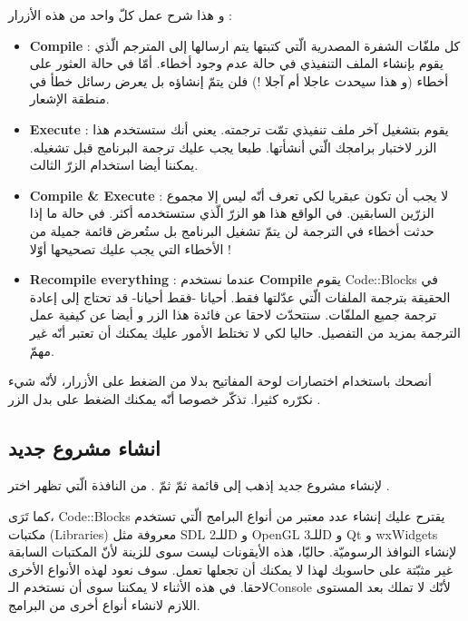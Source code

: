 
و هذا شرح عمل كلّ واحد من هذه الأزرار :

\begin{itemize}
  \item \textbf{\textenglish{Compile}} :
كل ملفّات الشفرة المصدرية الّتي كتبتها يتم ارسالها إلى المترجم الّذي يقوم بإنشاء الملف التنفيذي في حالة عدم وجود أخطاء. أمّا في حالة العثور على أخطاء (و هذا سيحدث عاجلا أم آجلا !) فلن يتمّ إنشاؤه بل يعرض رسائل خطأ في منطقة الإشعار.
  \item \textbf{\textenglish{Execute}} :
يقوم بتشغيل آخر ملف تنفيذي تمّت ترجمته. يعني أنك ستستخدم هذا الزر لاختبار برامجك الّتي أنشأتها. طبعا يجب عليك ترجمة البرنامج قبل تشغيله. يمكننا أيضا استخدام الزرّ الثالث.
  \item \textbf{\textenglish{Compile \& Execute}} :
لا يجب أن تكون عبقريا لكي تعرف أنّه ليس إلا مجموع الزرّين السابقين. في الواقع هذا هو الزرّ الّذي ستستخدمه أكثر. في حالة ما إذا حدثت أخطاء في الترجمة لن يتمّ تشغيل البرنامج بل ستُعرض قائمة جميلة من الأخطاء التي يجب عليك تصحيحها أوّلا !
  \item \textbf{\textenglish{Recompile everything}} :
 عندما نستخدم
\textbf{\textenglish{Compile}}
يقوم
\textenglish{Code::Blocks}
في الحقيقة بترجمة الملفات الّتي عدّلتها فقط. أحيانا -فقط أحيانا- قد تحتاج إلى إعادة ترجمة جميع الملفّات. سنتحدّث لاحقا عن فائدة هذا الزر و أيضا عن كيفية عمل الترجمة بمزيد من التفصيل. حاليا لكي لا تختلط الأمور عليك يمكنك أن تعتبر أنّه غير مهمّ.
\end{itemize}

\begin{information}
أنصحك باستخدام اختصارات لوحة المفاتيح بدلا من الضغط على الأزرار، لأنّه شيء نكرّره كثيرا. تذكّر خصوصا أنّه يمكنك الضغط على
بدل الزر
.
\end{information}

\subsection{انشاء مشروع جديد}

لإنشاء مشروع جديد إذهب إلى قائمة
ثمّ
ثمّ
.
من النافذة الّتي تظهر اختر
.


\begin{information}
كما تَرَى،
\textenglish{Code::Blocks}
يقترح عليك إنشاء عدد معتبر من أنواع البرامج الّتي تستخدم مكتبات
(\textenglish{Libraries})
معروفة مثل
\textenglish{SDL}
للـ\textenglish{2D}
و
\textenglish{OpenGL}
للـ\textenglish{3D}
و
\textenglish{Qt}
و
\textenglish{wxWidgets}
لإنشاء النوافذ الرسوميّة. حاليّا، هذه الأيقونات ليست سوى للزينة لأنّ المكتبات السابقة غير مثبّتة على حاسوبك لهذا لا يمكنك أن تجعلها تعمل. سوف نعود لهذه الأنواع الأخرى لاحقا. في هذه الأثناء لا يمكننا سوى أن نستخدم الـ\textenglish{Console}
لأنّك لا تملك بعد المستوى اللازم لانشاء أنواع أخرى من البرامج.
\end{information}

